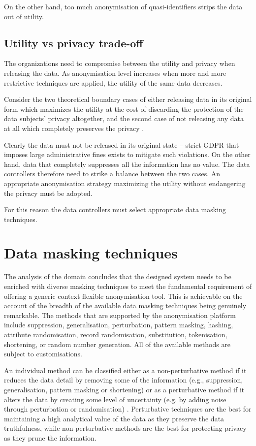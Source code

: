\documentclass[a4paper,twoside,12pt]{book}
\begin{document}
On the other hand, too much anonymisation of quasi-identifiers strips the data out of utility.

\subsection{Utility vs privacy trade-off}
The organizations need to compromise between the utility and privacy when releasing the data. As anonymisation level increases when more and more restrictive techniques are applied, the utility of the same data decreases.

Consider the two theoretical boundary cases of either releasing data in its original form which maximizes the utility at the cost of discarding the protection of the data subjects' privacy altogether, and the second case of not releasing any data at all which completely preserves the privacy \cite{bib:privacy_digital_world}.

Clearly the data must not be released in its original state – strict GDPR that imposes large administrative fines \cite{bib:art83} exists to mitigate such violations. On the other hand, data that completely suppresses all the information has no value. The data controllers therefore need to strike a balance between the two cases. An appropriate anonymisation strategy maximizing the utility without endangering the privacy must be adopted.

For this reason the data controllers must select appropriate data masking techniques.

\section{Data masking techniques}

The analysis of the domain concludes that the designed system needs to be enriched with diverse masking techniques to meet the fundamental requirement of offering a generic context flexible anonymisation tool. This is achievable on the account of the breadth of the available data masking techniques being genuinely remarkable. The methods that are supported by the anonymisation platform include suppression, generalisation, perturbation, pattern masking, hashing, attribute randomisation, record randomisation, substitution, tokenisation, shortening, or random number generation. All of the available methods are subject to customisations.

An individual method can be classified either as a non-perturbative method if it reduces the data detail by removing some of the information (e.g., suppression, generalisation, pattern masking or shortening) or as a perturbative method if it alters the data by creating some level of uncertainty (e.g. by adding noise through perturbation or randomisation) \cite{bib:anonymization_emr}. Perturbative techniques are the best for maintaining a high analytical value of the data as they preserve the data truthfulness, while non-perturbative methods are the best for protecting privacy as they prune the information.
\end{document}
